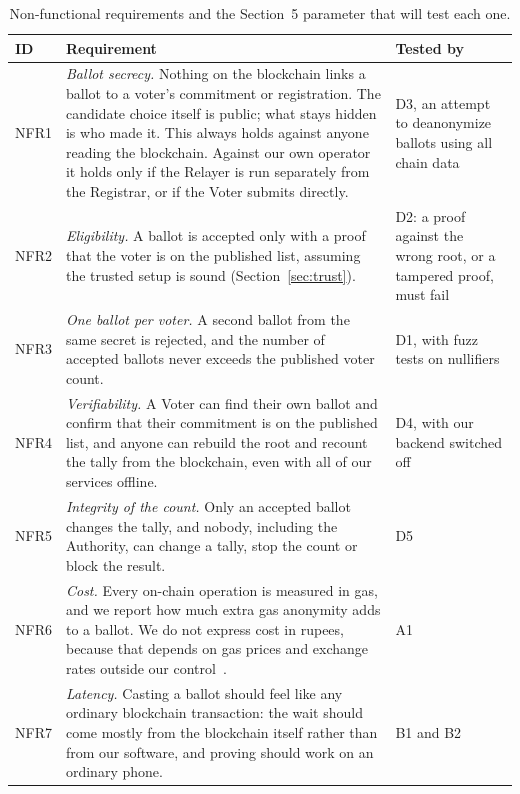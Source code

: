 \begin{longtable}{@{}>{\RaggedRight\arraybackslash\small}p{1.5cm}>{\RaggedRight\arraybackslash\small}p{10.4cm}>{\RaggedRight\arraybackslash\small}p{5.4cm}@{}}
  \caption{Non-functional requirements and the Section~5 parameter that will test each one.}\label{tab:nfr}\\
  \toprule
  \textbf{ID} & \textbf{Requirement} & \textbf{Tested by} \\
  \midrule
  \endhead
  \bottomrule
  \endlastfoot
  NFR1 & \emph{Ballot secrecy.} Nothing on the blockchain links a ballot to a voter's commitment or registration. The candidate choice itself is public; what stays hidden is who made it. This always holds against anyone reading the blockchain. Against our own operator it holds only if the Relayer is run separately from the Registrar, or if the Voter submits directly. & D3, an attempt to deanonymize ballots using all chain data \\
  \addlinespace[2pt]
  NFR2 & \emph{Eligibility.} A ballot is accepted only with a proof that the voter is on the published list, assuming the trusted setup is sound (Section~\ref{sec:trust}). & D2: a proof against the wrong root, or a tampered proof, must fail \\
  \addlinespace[2pt]
  NFR3 & \emph{One ballot per voter.} A second ballot from the same secret is rejected, and the number of accepted ballots never exceeds the published voter count. & D1, with fuzz tests on nullifiers \\
  \addlinespace[2pt]
  NFR4 & \emph{Verifiability.} A Voter can find their own ballot and confirm that their commitment is on the published list, and anyone can rebuild the root and recount the tally from the blockchain, even with all of our services offline. & D4, with our backend switched off \\
  \addlinespace[2pt]
  NFR5 & \emph{Integrity of the count.} Only an accepted ballot changes the tally, and nobody, including the Authority, can change a tally, stop the count or block the result. & D5 \\
  \addlinespace[2pt]
  NFR6 & \emph{Cost.} Every on-chain operation is measured in gas, and we report how much extra gas anonymity adds to a ballot. We do not express cost in rupees, because that depends on gas prices and exchange rates outside our control~\cite{ethgas}. & A1 \\
  \addlinespace[2pt]
  NFR7 & \emph{Latency.} Casting a ballot should feel like any ordinary blockchain transaction: the wait should come mostly from the blockchain itself rather than from our software, and proving should work on an ordinary phone. & B1 and B2 \\

\end{longtable}
